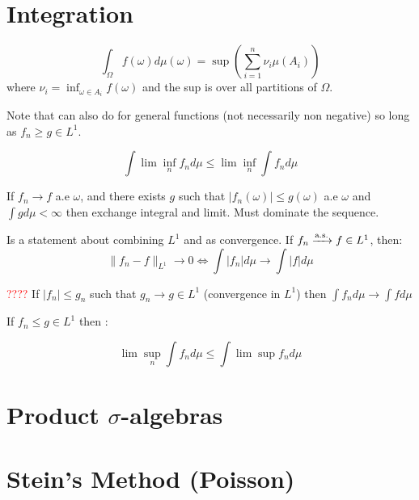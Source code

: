 \documentclass{article}
\newcommand\myworries[1]{\textcolor{red}{#1}}
\begin{document}
\section{Integration}
\begin{definition}
$$\int_\Omega f(\omega) d\mu(\omega) = \sup \left (\sum_{i=1}^n \nu_i \mu(A_i)\right)$$
where $\nu_i = \inf_{\omega \in A_i} f(\omega)$ and the sup is over all partitions of $\Omega$.
\end{definition}
\begin{theorem}[MCT]
Note that can also do for general functions (not necessarily non negative) so long as $f_n \geq g \in L^1$.
\end{theorem}
\begin{theorem}
$$\int \lim \inf_n f_n d\mu \leq \lim \inf_n \int f_n d\mu $$
\end{theorem}
\begin{theorem}[DCT]
If $f_n \to f$ a.e $\omega$, and there exists $g$ such that $|f_n(\omega)|\leq g(\omega)$ a.e $\omega$ and $\int gd\mu <\infty$ then exchange integral and limit. Must dominate the sequence. 
\end{theorem}

\begin{theorem}
Is a statement about combining $L^1$ and as convergence. If $f_n \xrightarrow{\mathrm{a.s.}} f\in L^1$, then:
$$\| f_n -f\|_{L^1} \to 0 \iff \int |f_n| d\mu \to \int |f|d\mu $$
\end{theorem}


\begin{theorem}
\myworries{????}
If $|f_n|\leq g_n$ such that $g_n \to g \in L^1$ (convergence in $L^1$) then $\int f_n d\mu \to \int fd\mu$
\end{theorem}

\begin{theorem}
If $f_n \leq g \in L^1$ then :

$$\lim \sup_n \int f_n d\mu \leq \int \lim \sup f_n d\mu$$
\end{theorem}

\section{Product $\sigma$-algebras}

\section{Stein's Method (Poisson)}
\end{document}
